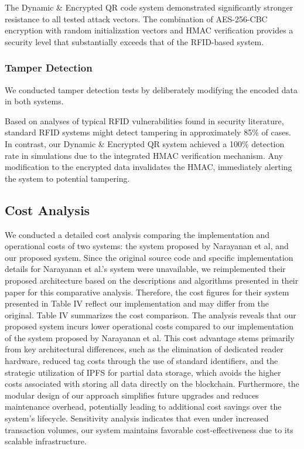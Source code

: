 \documentclass[conference]{IEEEtran}
\begin{document}
The Dynamic \& Encrypted QR code system demonstrated significantly stronger resistance to all tested attack vectors. The combination of AES-256-CBC encryption with random initialization vectors and HMAC verification provides a security level that substantially exceeds that of the RFID-based system.

\subsubsection{Tamper Detection}
We conducted tamper detection tests by deliberately modifying the encoded data in both systems. 

Based on analyses of typical RFID vulnerabilities found in security literature, standard RFID systems might detect tampering in approximately 85\% of cases. In contrast, our Dynamic \& Encrypted QR system achieved a 100\% detection rate in simulations due to the integrated HMAC verification mechanism. Any modification to the encrypted data invalidates the HMAC, immediately alerting the system to potential tampering.

\subsection{Cost Analysis}
We conducted a detailed cost analysis comparing the implementation and operational costs of two systems: the system proposed by Narayanan et al\cite{narayanan2024role}, and our proposed system. Since the original source code and specific implementation details for Narayanan et al.\cite{narayanan2024role}'s system were unavailable, we reimplemented their proposed architecture based on the descriptions and algorithms presented in their paper for this comparative analysis. Therefore, the cost figures for their system presented in Table IV reflect our implementation and may differ from the original. Table IV summarizes the cost comparison. The analysis reveals that our proposed system incurs lower operational costs compared to our implementation of the system proposed by Narayanan\cite{narayanan2024role} et al. This cost advantage stems primarily from key architectural differences, such as the elimination of dedicated reader hardware, reduced tag costs through the use of standard identifiers, and the strategic utilization of IPFS for partial data storage, which avoids the higher costs associated with storing all data directly on the blockchain. Furthermore, the modular design of our approach simplifies future upgrades and reduces maintenance overhead, potentially leading to additional cost savings over the system’s lifecycle. Sensitivity analysis indicates that even under increased transaction volumes, our system maintains favorable cost-effectiveness due to its scalable infrastructure.
\end{document}
